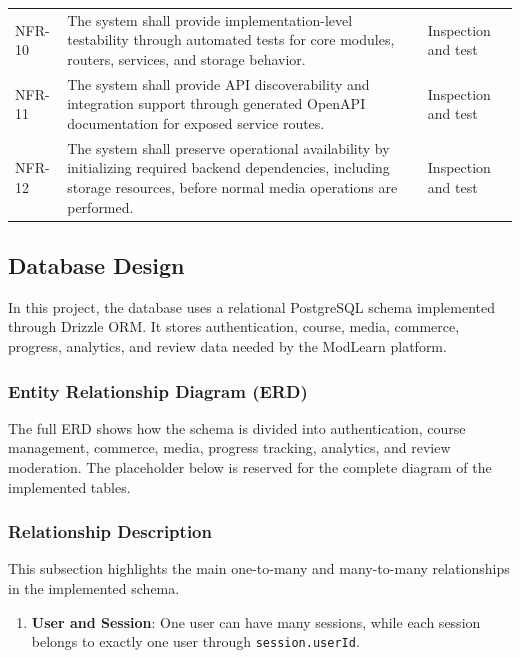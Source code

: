 \begin{longtable}{L{1.7cm}L{10.1cm}L{2.0cm}}
NFR-10 & The system shall provide implementation-level testability through automated tests for core modules, routers, services, and storage behavior. & Inspection and test \\
NFR-11 & The system shall provide API discoverability and integration support through generated OpenAPI documentation for exposed service routes. & Inspection and test \\
NFR-12 & The system shall preserve operational availability by initializing required backend dependencies, including storage resources, before normal media operations are performed. & Inspection and test \\
\end{longtable}

\subsection{Database Design}

In this project, the database uses a relational PostgreSQL schema implemented through Drizzle ORM. It stores authentication, course, media, commerce, progress, analytics, and review data needed by the ModLearn platform.

\subsubsection{Entity Relationship Diagram (ERD)}

\noindent
The full ERD shows how the schema is divided into authentication, course management, commerce, media, progress tracking, analytics, and review moderation. The placeholder below is reserved for the complete diagram of the implemented tables.

\begin{center}
\end{center}

\subsubsection{Relationship Description}

This subsection highlights the main one-to-many and many-to-many relationships in the implemented schema.

\begin{enumerate}
    \item \textbf{User and Session}:
    One user can have many sessions, while each session belongs to exactly one user through \texttt{session.userId}.
\end{enumerate}

